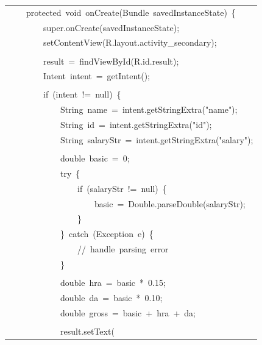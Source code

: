 \documentclass[a4paper,12pt]{article}
\begin{document}
\begin{longtable}{|p{}|}
{\ttfamily\small \ \ \ \ protected\ void\ onCreate(Bundle\ savedInstanceState)\ \{} \\
{\ttfamily\small \ \ \ \ \ \ \ \ super.onCreate(savedInstanceState);} \\
{\ttfamily\small \ \ \ \ \ \ \ \ setContentView(R.layout.activity\_secondary);} \\
\strut \\
{\ttfamily\small \ \ \ \ \ \ \ \ result\ =\ findViewById(R.id.result);} \\
{\ttfamily\small \ \ \ \ \ \ \ \ Intent\ intent\ =\ getIntent();} \\
\strut \\
{\ttfamily\small \ \ \ \ \ \ \ \ if\ (intent\ !=\ null)\ \{} \\
{\ttfamily\small \ \ \ \ \ \ \ \ \ \ \ \ String\ name\ =\ intent.getStringExtra("name");} \\
{\ttfamily\small \ \ \ \ \ \ \ \ \ \ \ \ String\ id\ =\ intent.getStringExtra("id");} \\
{\ttfamily\small \ \ \ \ \ \ \ \ \ \ \ \ String\ salaryStr\ =\ intent.getStringExtra("salary");} \\
\strut \\
{\ttfamily\small \ \ \ \ \ \ \ \ \ \ \ \ double\ basic\ =\ 0;} \\
{\ttfamily\small \ \ \ \ \ \ \ \ \ \ \ \ try\ \{} \\
{\ttfamily\small \ \ \ \ \ \ \ \ \ \ \ \ \ \ \ \ if\ (salaryStr\ !=\ null)\ \{} \\
{\ttfamily\small \ \ \ \ \ \ \ \ \ \ \ \ \ \ \ \ \ \ \ \ basic\ =\ Double.parseDouble(salaryStr);} \\
{\ttfamily\small \ \ \ \ \ \ \ \ \ \ \ \ \ \ \ \ \}} \\
{\ttfamily\small \ \ \ \ \ \ \ \ \ \ \ \ \}\ catch\ (Exception\ e)\ \{} \\
{\ttfamily\small \ \ \ \ \ \ \ \ \ \ \ \ \ \ \ \ //\ handle\ parsing\ error} \\
{\ttfamily\small \ \ \ \ \ \ \ \ \ \ \ \ \}} \\
\strut \\
{\ttfamily\small \ \ \ \ \ \ \ \ \ \ \ \ double\ hra\ =\ basic\ *\ 0.15;} \\
{\ttfamily\small \ \ \ \ \ \ \ \ \ \ \ \ double\ da\ =\ basic\ *\ 0.10;} \\
{\ttfamily\small \ \ \ \ \ \ \ \ \ \ \ \ double\ gross\ =\ basic\ +\ hra\ +\ da;} \\
\strut \\
{\ttfamily\small \ \ \ \ \ \ \ \ \ \ \ \ result.setText(} \\

\end{longtable}
\end{document}
